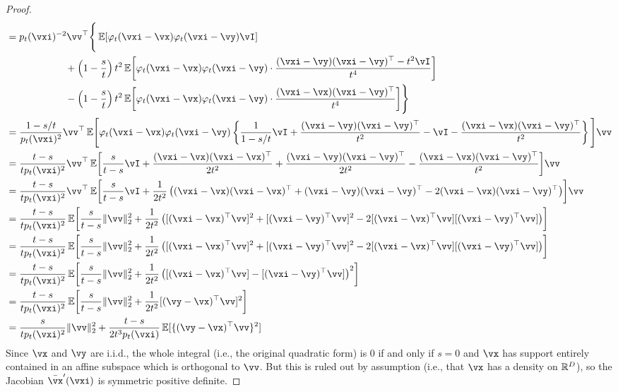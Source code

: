 \documentclass[../../book-main.tex]{subfiles}
\begin{document}
\begin{proof}
\begin{align}
        &= p_{t}(\vxi)^{-2}\vv^{\top}\Bigg\{\Ex[\phi_{t}(\vxi - \vx)\phi_{t}(\vxi - \vy)\vI] \\
        & \qquad \qquad \qquad + \bp{1 - \frac{s}{t}}t^{2}\Ex\rs{\phi_{t}(\vxi - \vx)\phi_{t}(\vxi - \vy)\cdot\frac{(\vxi - \vy)(\vxi - \vy)^{\top} - t^{2}\vI}{t^{4}}} \\
        & \qquad \qquad \qquad -\bp{1 - \frac{s}{t}}t^{2}\Ex\rs{\phi_{t}(\vxi - \vx)\phi_{t}(\vxi - \vy)\cdot\frac{(\vxi - \vx)(\vxi - \vy)^{\top}}{t^{4}}}\Bigg\} \\ 
        &= \frac{1 - s/t}{p_{t}(\vxi)^{2}}\vv^{\top}\Ex\mathopen{}\Bigg[\phi_{t}(\vxi - \vx)\phi_{t}(\vxi - \vy)\bc{\frac{1}{1 - s/t}\vI + \frac{(\vxi - \vy)(\vxi - \vy)^{\top}}{t^{2}} - \vI - \frac{(\vxi - \vx)(\vxi - \vy)^{\top}}{t^{2}}}\Bigg]\vv \\
        &= \frac{t - s}{tp_{t}(\vxi)^{2}}\vv^{\top}\Ex\rs{\frac{s}{t - s}\vI +\frac{(\vxi - \vx)(\vxi - \vx)^{\top}}{2t^{2}} + \frac{(\vxi - \vy)(\vxi - \vy)^{\top}}{2t^{2}} - \frac{(\vxi - \vx)(\vxi - \vy)^{\top}}{t^{2}}}\vv \\
        &= \frac{t - s}{tp_{t}(\vxi)^{2}}\vv^{\top}\Ex\rs{\frac{s}{t - s}\vI +\frac{1}{2t^{2}}\bp{(\vxi - \vx)(\vxi - \vx)^{\top} + (\vxi - \vy)(\vxi - \vy)^{\top} - 2(\vxi - \vx)(\vxi - \vy)^{\top}}}\vv \\
        &= \frac{t - s}{tp_{t}(\vxi)^{2}}\Ex\rs{\frac{s}{t - s}\norm{\vv}_{2}^{2} +\frac{1}{2t^{2}}\bp{[(\vxi - \vx)^{\top}\vv]^{2} + [(\vxi - \vy)^{\top}\vv]^{2} - 2[(\vxi - \vx)^{\top}\vv][(\vxi - \vy)^{\top}\vv]}} \\
        &= \frac{t - s}{tp_{t}(\vxi)^{2}}\Ex\rs{\frac{s}{t - s}\norm{\vv}_{2}^{2} +\frac{1}{2t^{2}}\bp{[(\vxi - \vx)^{\top}\vv]^{2} + [(\vxi - \vy)^{\top}\vv]^{2} - 2[(\vxi - \vx)^{\top}\vv][(\vxi - \vy)^{\top}\vv]}} \\
        &= \frac{t - s}{tp_{t}(\vxi)^{2}}\Ex\rs{\frac{s}{t - s}\norm{\vv}_{2}^{2} +\frac{1}{2t^{2}}\bp{[(\vxi - \vx)^{\top}\vv] - [(\vxi - \vy)^{\top}\vv]}^{2}} \\
        &= \frac{t - s}{tp_{t}(\vxi)^{2}}\Ex\rs{\frac{s}{t - s}\norm{\vv}_{2}^{2} +\frac{1}{2t^{2}}[(\vy - \vx)^{\top}\vv]^{2}} \\
        &= \frac{s}{tp_{t}(\vxi)^{2}}\norm{\vv}_{2}^{2} + \frac{t - s}{2t^{3}p_{t}(\vxi)}\Ex[\{(\vy - \vx)^{\top}\vv\}^{2}]
    \end{align}
    Since \(\vx\) and \(\vy\) are i.i.d., the whole integral (i.e., the original quadratic form) is \(0\) if and only if \(s = 0\) and \(\vx\) has support entirely contained in an affine subspace which is orthogonal to \(\vv\). But this is ruled out by assumption (i.e., that \(\vx\) has a density on \(\mathbb{R}^{D}\)), so the Jacobian \(\bar{\vx}^{\prime}(\vxi)\) is symmetric positive definite.
\end{proof}
\end{document}
